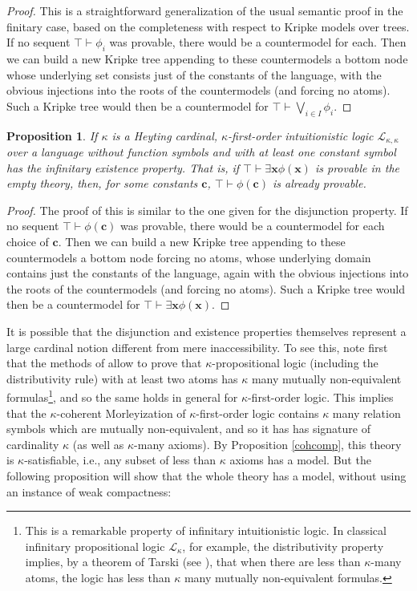 \documentclass[a4paper,11pt]{article}
\theoremstyle{plain}
\newtheorem{proposition}[thm]{Proposition}
\theoremstyle{plain}
\theoremstyle{remark}
\begin{document}
\begin{proof}
 This is a straightforward generalization of the usual semantic proof in the finitary case, based on the completeness with respect to Kripke models over trees. If no sequent $\top \vdash \phi_i$ was provable, there would be a countermodel for each. Then we can build a new Kripke tree appending to these countermodels a bottom node whose underlying set consists just of the constants of the language, with the obvious injections into the roots of the countermodels (and forcing no atoms). Such a Kripke tree would then be a countermodel for $\top \vdash \bigvee_{i \in I}\phi_i$.
\end{proof}


\begin{proposition}
If $\kappa$ is a Heyting cardinal, $\kappa$-first-order intuitionistic logic $\mathcal{L}_{\kappa, \kappa}$ over a language without function symbols and with at least one constant symbol has the infinitary existence property. That is, if $\top \vdash \exists \mathbf{x} \phi(\mathbf{x})$ is provable in the empty theory, then, for some constants $\mathbf{c}$, $\top \vdash \phi(\mathbf{c})$ is already provable.
\end{proposition}

\begin{proof}
 The proof of this is similar to the one given for the disjunction property. If no sequent $\top \vdash \phi(\mathbf{c})$ was provable, there would be a countermodel for each choice of $\mathbf{c}$. Then we can build a new Kripke tree appending to these countermodels a bottom node forcing no atoms, whose underlying domain contains just the constants of the language, again with the obvious injections into the roots of the countermodels (and forcing no atoms). Such a Kripke tree would then be a countermodel for $\top \vdash \exists \mathbf{x} \phi(\mathbf{x})$.
\end{proof}

It is possible that the disjunction and existence properties themselves represent a large cardinal notion different from mere inaccessibility. To see this, note first that the methods of \cite{jongh} allow to prove that $\kappa$-propositional logic (including the distributivity rule) with at least two atoms has $\kappa$ many mutually non-equivalent formulas\footnote{This is a remarkable property of infinitary intuitionistic logic. In classical infinitary propositional logic $\mathcal{L}_{\kappa}$, for example, the distributivity property implies, by a theorem of Tarski (see \cite{tarski}), that when there are less than $\kappa$-many atoms, the logic has less than $\kappa$ many mutually non-equivalent formulas.}, and so the same holds in general for $\kappa$-first-order logic. This implies that the $\kappa$-coherent Morleyization of $\kappa$-first-order logic contains $\kappa$ many relation symbols which are mutually non-equivalent, and so it has has signature of cardinality $\kappa$ (as well as $\kappa$-many axioms). By Proposition \ref{cohcomp}, this theory is $\kappa$-satisfiable, i.e., any subset of less than $\kappa$ axioms has a model. But the following proposition will show that the whole theory has a model, without using an instance of weak compactness:
\end{document}
